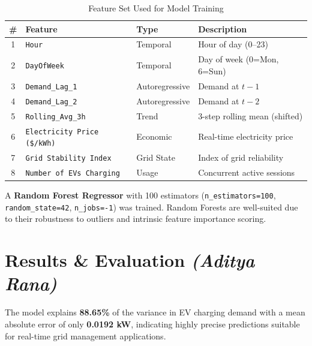 \documentclass[12pt, a4paper]{article}
\begin{document}
\begin{table}[h!]
\centering
\caption{Feature Set Used for Model Training}
\renewcommand{\arraystretch}{1.4}
\begin{tabular}{clll}
\toprule
\rowcolor{tableheader}
\color{white}\textbf{\#} &
\color{white}\textbf{Feature} &
\color{white}\textbf{Type} &
\color{white}\textbf{Description} \\
\midrule
1 & \texttt{Hour}                       & Temporal       & Hour of day (0--23) \\
\rowcolor{lightgray}
2 & \texttt{DayOfWeek}                  & Temporal       & Day of week (0=Mon, 6=Sun) \\
3 & \texttt{Demand\_Lag\_1}             & Autoregressive & Demand at $t-1$ \\
\rowcolor{lightgray}
4 & \texttt{Demand\_Lag\_2}             & Autoregressive & Demand at $t-2$ \\
5 & \texttt{Rolling\_Avg\_3h}           & Trend          & 3-step rolling mean (shifted) \\
\rowcolor{lightgray}
6 & \texttt{Electricity Price (\$/kWh)} & Economic       & Real-time electricity price \\
7 & \texttt{Grid Stability Index}       & Grid State     & Index of grid reliability \\
\rowcolor{lightgray}
8 & \texttt{Number of EVs Charging}     & Usage          & Concurrent active sessions \\
\bottomrule
\end{tabular}
\end{table}

A \textbf{Random Forest Regressor} with 100 estimators (\texttt{n\_estimators=100},
\texttt{random\_state=42}, \texttt{n\_jobs=-1}) was trained. Random Forests are
well-suited due to their robustness to outliers and intrinsic feature importance scoring.

\section{Results \& Evaluation \textnormal{\small\itshape(Aditya Rana)}}

\begin{tcolorbox}[highlight, title=Key Finding]
The model explains \textbf{88.65\%} of the variance in EV charging demand with a
mean absolute error of only \textbf{0.0192 kW}, indicating highly precise predictions
suitable for real-time grid management applications.
\end{tcolorbox}
\end{document}
